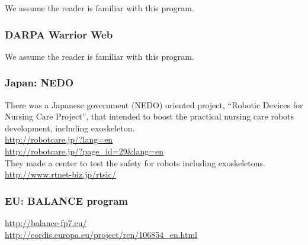 \noindent
We assume the reader is familiar with this program.

\subsubsection{DARPA Warrior Web}

\noindent
We assume the reader is familiar with this program.

\subsubsection{Japan: NEDO}

\noindent
There was a Japanese government (NEDO) oriented project, ``Robotic
Devices for Nursing Care Project'', that intended to boost the
practical nursing care robots development, including exoskeleton.\\
\url{http://robotcare.jp/?lang=en}\\
\url{http://robotcare.jp/?page_id=29&lang=en}\\
They made a center to test the safety for robots including exoskeletons.\\
\url{http://www.rtnet-biz.jp/rtsic/}\\

\subsubsection{EU: BALANCE program}

\noindent
\url{http://balance-fp7.eu/}\\
\url{http://cordis.europa.eu/project/rcn/106854_en.html}\\




